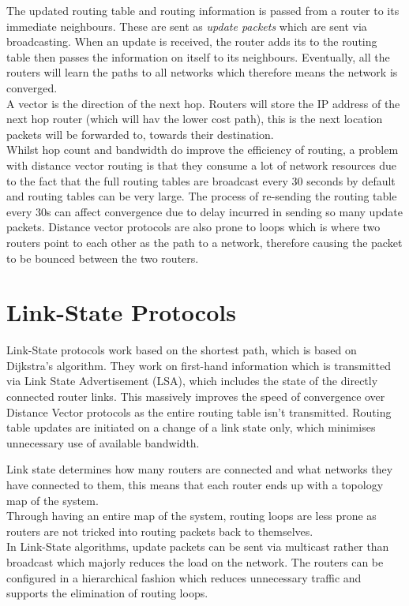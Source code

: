 The updated routing table and routing information is passed from a router to its immediate neighbours. These are sent as \textit{update packets} which are sent via broadcasting. When an update is received, the router adds its to the routing table then passes the information on itself to its neighbours. Eventually, all the routers will learn the paths to all networks which therefore means the network is converged.\\

A vector is the direction of the next hop. Routers will store the IP address of the next hop router (which will hav the lower cost path), this is the next location packets will be forwarded to, towards their destination.\\

Whilst hop count and bandwidth do improve the efficiency of routing, a problem with distance vector routing is that they consume a lot of network resources due to the fact that the full routing tables are broadcast every 30 seconds by default and routing tables can be very large. The process of re-sending the routing table every 30s can affect convergence due to delay incurred in sending so many update packets. Distance vector protocols are also prone to loops which is where two routers point to each other as the path to a network, therefore causing the packet to be bounced between the two routers.

\section{Link-State Protocols}
Link-State protocols work based on the shortest path, which is based on Dijkstra's algorithm. They work on first-hand information which is transmitted via Link State Advertisement (LSA), which includes the state of the directly connected router links. This massively improves the speed of convergence over Distance Vector protocols as the entire routing table isn't transmitted. Routing table updates are initiated on a change of a link state only, which minimises unnecessary use of available bandwidth. 

Link state determines how many routers are connected and what networks they have connected to them, this means that each router ends up with a topology map of the system.\\

Through having an entire map of the system, routing loops are less prone as routers are not tricked into routing packets back to themselves.\\

In Link-State algorithms, update packets can be sent via multicast rather than broadcast which majorly reduces the load on the network. The routers can be configured in a hierarchical fashion which reduces unnecessary traffic and supports the elimination of routing loops.

